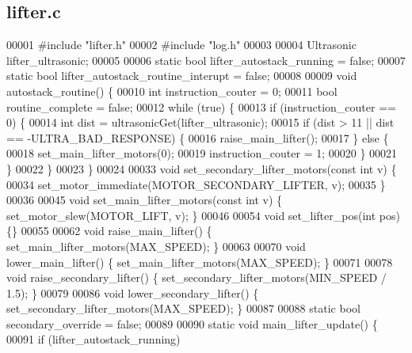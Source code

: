 \subsection{lifter.\+c}
\label{a00107_source}

\begin{DoxyCode}
00001 \textcolor{preprocessor}{#include "lifter.h"}
00002 \textcolor{preprocessor}{#include "log.h"}
00003 
00004 Ultrasonic lifter_ultrasonic;
00005 
00006 \textcolor{keyword}{static} \textcolor{keywordtype}{bool} lifter_autostack_running = \textcolor{keyword}{false};
00007 \textcolor{keyword}{static} \textcolor{keywordtype}{bool} lifter_autostack_routine_interupt = \textcolor{keyword}{false};
00008 
00009 \textcolor{keywordtype}{void} autostack_routine() \{
00010   \textcolor{keywordtype}{int} instruction\_couter = 0;
00011   \textcolor{keywordtype}{bool} routine\_complete = \textcolor{keyword}{false};
00012   \textcolor{keywordflow}{while} (\textcolor{keyword}{true}) \{
00013     \textcolor{keywordflow}{if} (instruction\_couter == 0) \{
00014       \textcolor{keywordtype}{int} dist = ultrasonicGet(lifter_ultrasonic);
00015       \textcolor{keywordflow}{if} (dist > 11 || dist == -ULTRA\_BAD\_RESPONSE) \{
00016         raise_main_lifter();
00017       \} \textcolor{keywordflow}{else} \{
00018         set_main_lifter_motors(0);
00019         instruction\_couter = 1;
00020       \}
00021     \}
00022   \}
00023 \}
00024 
00033 \textcolor{keywordtype}{void} set_secondary_lifter_motors(\textcolor{keyword}{const} \textcolor{keywordtype}{int} v) \{
00034   set_motor_immediate(MOTOR_SECONDARY_LIFTER, v);
00035 \}
00036 
00045 \textcolor{keywordtype}{void} set_main_lifter_motors(\textcolor{keyword}{const} \textcolor{keywordtype}{int} v) \{ set_motor_slew(MOTOR_LIFT, v); \}
00046 
00054 \textcolor{keywordtype}{void} set_lifter_pos(\textcolor{keywordtype}{int} pos) \{\}
00055 
00062 \textcolor{keywordtype}{void} raise_main_lifter() \{ set_main_lifter_motors(MAX_SPEED); \}
00063 
00070 \textcolor{keywordtype}{void} lower_main_lifter() \{ set_main_lifter_motors(MAX_SPEED); \}
00071 
00078 \textcolor{keywordtype}{void} raise_secondary_lifter() \{ set_secondary_lifter_motors(MIN_SPEED / 1.5); \}
00079 
00086 \textcolor{keywordtype}{void} lower_secondary_lifter() \{ set_secondary_lifter_motors(MAX_SPEED); \}
00087 
00088 \textcolor{keyword}{static} \textcolor{keywordtype}{bool} secondary_override = \textcolor{keyword}{false};
00089 
00090 \textcolor{keyword}{static} \textcolor{keywordtype}{void} main_lifter_update() \{
00091   \textcolor{keywordflow}{if} (lifter_autostack_running)

\end{DoxyCode}
